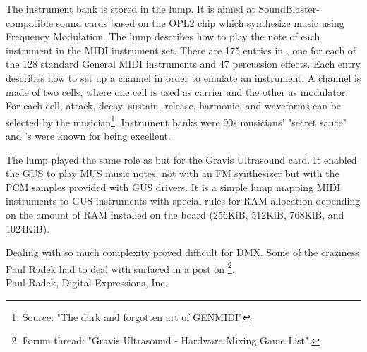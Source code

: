\par
The instrument bank is stored in the  lump. It is aimed at SoundBlaster-compatible sound cards based on the OPL2 chip which synthesize music using Frequency Modulation. The lump describes how to play the note of each instrument in the MIDI instrument set. There are 175 entries in , one for each of the 128 standard General MIDI instruments and 47 percussion effects. Each entry describes how to set up a channel in order to emulate an instrument. A channel is made of two cells, where one cell is used as carrier and the other as modulator. For each cell, attack, decay, sustain, release, harmonic, and waveforms can be selected by the musician\footnote{Source: "The dark and forgotten art of GENMIDI" }. Instrument banks were 90s musicians' "secret sauce" and \doom's were known for being excellent.\\
\par
The  lump played the same role as  but for the Gravis Ultrasound card. It enabled the GUS to play MUS music notes, not with an FM synthesizer but with the PCM samples provided with GUS drivers. It is a simple lump mapping MIDI instruments to GUS instruments with special rules for RAM allocation depending on the amount of RAM installed on the board (256KiB, 512KiB, 768KiB, and 1024KiB).\pagebreak



Dealing with so much complexity proved difficult for DMX. Some of the craziness Paul Radek had to deal with surfaced in a post on \footnote{Forum thread: "Gravis Ultrasound - Hardware Mixing Game List".}.\\





{Paul Radek, Digital Expressions, Inc.}\\
\par

